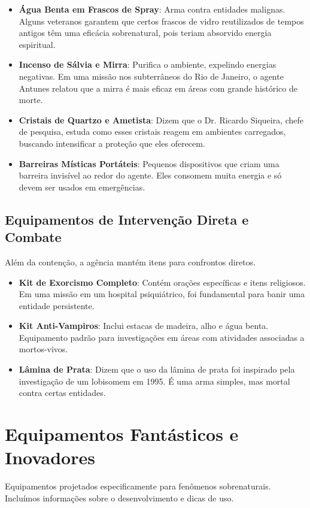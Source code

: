 \documentclass{book}
\begin{document}
\begin{itemize}
    \item \textbf{Água Benta em Frascos de Spray}: Arma contra entidades malignas. Alguns veteranos garantem que certos frascos de vidro reutilizados de tempos antigos têm uma eficácia sobrenatural, pois teriam absorvido energia espiritual.

    \item \textbf{Incenso de Sálvia e Mirra}: Purifica o ambiente, expelindo energias negativas. Em uma missão nos subterrâneos do Rio de Janeiro, o agente Antunes relatou que a mirra é mais eficaz em áreas com grande histórico de morte.

    \item \textbf{Cristais de Quartzo e Ametista}: Dizem que o Dr. Ricardo Siqueira, chefe de pesquisa, estuda como esses cristais reagem em ambientes carregados, buscando intensificar a proteção que eles oferecem.

    \item \textbf{Barreiras Místicas Portáteis}: Pequenos dispositivos que criam uma barreira invisível ao redor do agente. Eles consomem muita energia e só devem ser usados em emergências.
\end{itemize}

\section{Equipamentos de Intervenção Direta e Combate}
Além da contenção, a agência mantém itens para confrontos diretos.

\begin{itemize}
    \item \textbf{Kit de Exorcismo Completo}: Contém orações específicas e itens religiosos. Em uma missão em um hospital psiquiátrico, foi fundamental para banir uma entidade persistente.

    \item \textbf{Kit Anti-Vampiros}: Inclui estacas de madeira, alho e água benta. Equipamento padrão para investigações em áreas com atividades associadas a mortos-vivos.

    \item \textbf{Lâmina de Prata}: Dizem que o uso da lâmina de prata foi inspirado pela investigação de um lobisomem em 1995. É uma arma simples, mas mortal contra certas entidades.
\end{itemize}

\chapter{Equipamentos Fantásticos e Inovadores}
Equipamentos projetados especificamente para fenômenos sobrenaturais. Incluímos informações sobre o desenvolvimento e dicas de uso.
\end{document}
